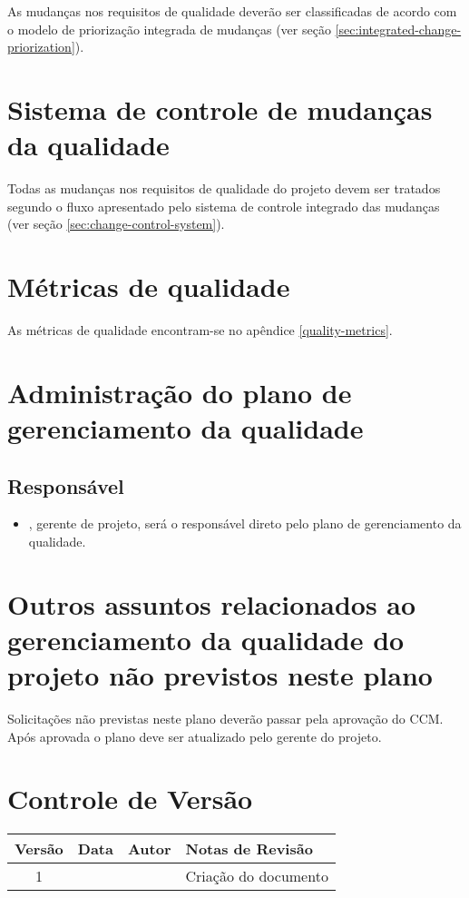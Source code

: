 As mudanças nos requisitos de qualidade deverão ser classificadas de acordo com o modelo de priorização integrada de mudanças (ver seção \ref{sec:integrated-change-priorization}).

\section{Sistema de controle de mudanças da qualidade}

Todas as mudanças nos requisitos de qualidade do projeto devem ser tratados segundo o fluxo apresentado pelo sistema de controle integrado das mudanças (ver seção \ref{sec:change-control-system}).

\section{Métricas de qualidade}

As métricas de qualidade encontram-se no apêndice \ref{quality-metrics}.

\section{Administração do plano de gerenciamento da qualidade}

\subsection{Responsável}

\begin{itemize}
	\item \projectManagerName{}, gerente de projeto, será o responsável direto pelo plano de gerenciamento da qualidade.
\end{itemize}

\section{Outros assuntos relacionados ao gerenciamento da qualidade do projeto não previstos neste plano}

Solicitações não previstas neste plano deverão passar pela aprovação do CCM. Após aprovada o plano deve ser atualizado pelo gerente do projeto.

\section{Controle de Versão}

\begin{table}[H]
	\begin{tabularx}{\textwidth}{| c | c | X | X |}
		\hline
		\textbf{Versão} & \textbf{Data} & \textbf{Autor}      & \textbf{Notas de Revisão} \\
		\hline
		1                &               & \projectManagerName{} & Criação do documento     \\
		\hline
	\end{tabularx}
	\centering
\end{table}

